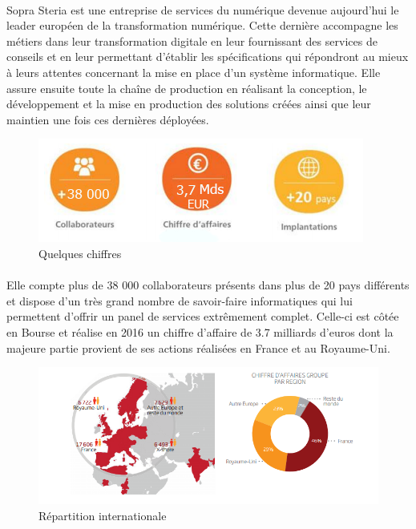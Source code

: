\paragraph{}
Sopra Steria est une entreprise de services du numérique devenue aujourd'hui le leader européen de la transformation numérique. Cette dernière accompagne les métiers dans leur transformation digitale en leur fournissant des services de conseils et en leur permettant d'établir les spécifications qui répondront au mieux à leurs attentes concernant la mise en place d'un système informatique. Elle assure ensuite toute la chaîne de production en réalisant la conception, le développement et la mise en production des solutions créées ainsi que leur maintien une fois ces dernières déployées.

\begin{figure}[h]
	\includegraphics[scale=1]{images/entreprise/sopraSteriaChiffres.png}
	\centering
	\caption{Quelques chiffres}
	\label{sopraSteriaChiffres}
\end{figure}

\paragraph{}
Elle compte plus de 38 000 collaborateurs présents dans plus de 20 pays différents et dispose d'un très grand nombre de savoir-faire informatiques qui lui permettent d'offrir un panel de services extrêmement complet. Celle-ci est côtée en Bourse et réalise en 2016 un chiffre d'affaire de 3.7 milliards d'euros dont la majeure partie provient de ses actions réalisées en France et au Royaume-Uni.

\begin{figure}[h]
	\includegraphics[scale=0.9]{images/entreprise/sopraSteriaMonde.png}
	\centering
	\caption{Répartition internationale}
	\label{sopraSteriaMonde}
\end{figure}
		
		